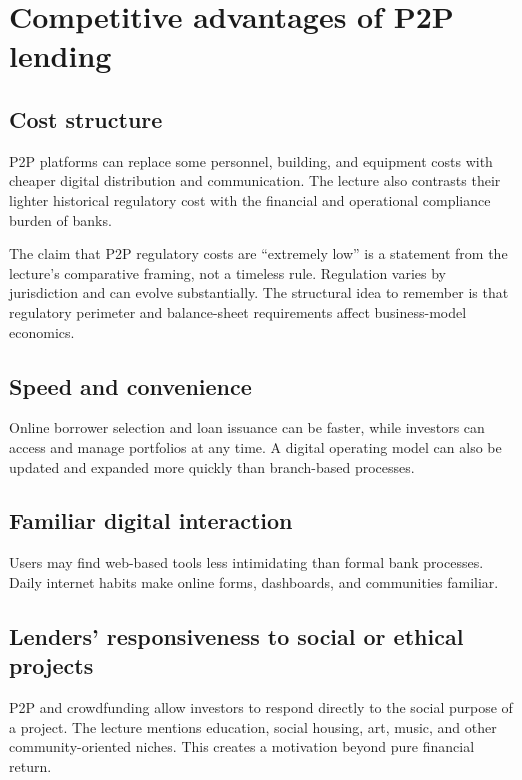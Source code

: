 \section{Competitive advantages of P2P lending}

\subsection{Cost structure}

P2P platforms can replace some personnel, building, and equipment costs with cheaper digital distribution and communication. The lecture also contrasts their lighter historical regulatory cost with the financial and operational compliance burden of banks.

\begin{pitfall}
The claim that P2P regulatory costs are ``extremely low'' is a statement from the lecture's comparative framing, not a timeless rule. Regulation varies by jurisdiction and can evolve substantially. The structural idea to remember is that regulatory perimeter and balance-sheet requirements affect business-model economics.
\end{pitfall}

\subsection{Speed and convenience}

Online borrower selection and loan issuance can be faster, while investors can access and manage portfolios at any time. A digital operating model can also be updated and expanded more quickly than branch-based processes.

\subsection{Familiar digital interaction}

Users may find web-based tools less intimidating than formal bank processes. Daily internet habits make online forms, dashboards, and communities familiar.

\subsection{Lenders' responsiveness to social or ethical projects}

P2P and crowdfunding allow investors to respond directly to the social purpose of a project. The lecture mentions education, social housing, art, music, and other community-oriented niches. This creates a motivation beyond pure financial return.

